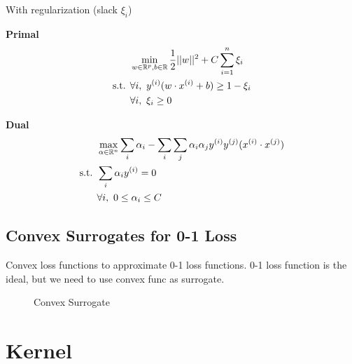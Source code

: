 \documentclass[a4paper]{report}
\begin{document}
With regularization (slack $\xi_i$)

\textbf{Primal}
\begin{align*}
& \min_{w\in \mathbb{R}^p, b\in \mathbb{R}} \frac{1}{2}||w||^2+C\sum_{i=1}^n\xi_i\\ 
\text{s.t. } & \forall i,~ y^{(i)}(w \cdot x^{(i)}+b)\geq 1 -\xi_i \\
& \forall i,~\xi_i \geq 0
\end{align*}

\textbf{Dual}
\begin{align*}
& \max_{\alpha \in \mathbb{R}^n} \sum_i \alpha_i -\sum_i\sum_j \alpha_i \alpha_j y^{(i)}y^{(j)}(x^{(i)}\cdot
x^{(j)}) \\
\text{s.t. } & \sum_i \alpha_i y^{(i)} = 0\\
& \forall i,~0\leq \alpha_i \leq C
\end{align*}

\section{Convex Surrogates for 0-1 Loss}
Convex loss functions to approximate 0-1 loss functions. 0-1 loss function is the ideal, but we need to use convex func as surrogate.

\begin{figure}[!htp]
\centering
{}
\caption{Convex Surrogate}
\label{fig:convexSurrogates}
\end{figure}


\chapter{Kernel}
\end{document}
